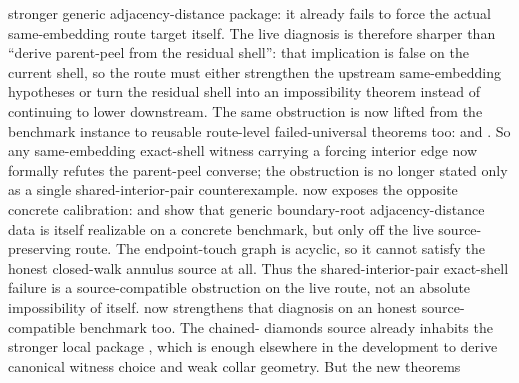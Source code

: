 \documentclass[11pt]{article}
\begin{document}
stronger generic adjacency-distance package: it already fails to force the
actual same-embedding  route
target itself.  The live diagnosis is therefore sharper than ``derive
parent-peel from the residual shell'': that implication is false on the
current shell, so the route must either strengthen the upstream same-embedding
hypotheses or turn the residual shell into an impossibility theorem instead of
continuing to lower downstream.  The same obstruction is now lifted from the
benchmark instance to reusable route-level failed-universal theorems too:
and
.
So any same-embedding exact-shell witness carrying a forcing interior edge now
formally refutes the parent-peel converse; the obstruction is no longer stated
only as a single shared-interior-pair counterexample.
 now exposes the
opposite concrete calibration:
and
show that generic boundary-root adjacency-distance data is itself realizable
on a concrete benchmark, but only off the live source-preserving route.  The
endpoint-touch graph is acyclic, so it cannot satisfy the honest closed-walk
annulus source at all.  Thus the shared-interior-pair exact-shell failure is a
source-compatible obstruction on the live route, not an absolute impossibility
of  itself.
 now strengthens
that diagnosis on an honest source-compatible benchmark too.  The chained-
diamonds source already inhabits the stronger local package
,
which is enough elsewhere in the development to derive canonical witness choice
and weak collar geometry.  But the new theorems
\end{document}
